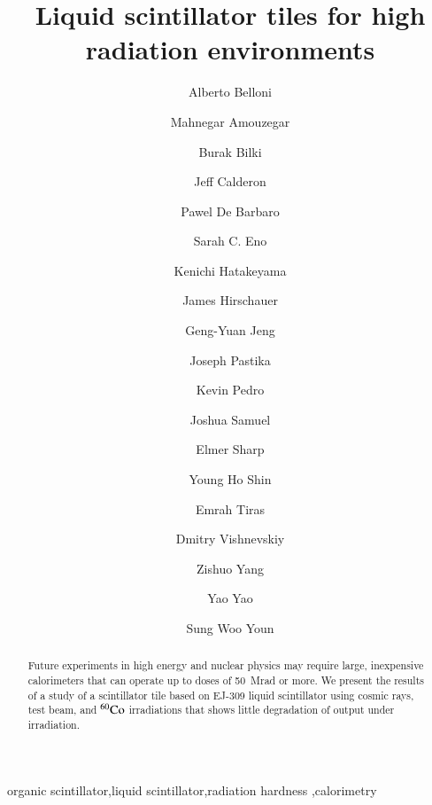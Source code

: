 \documentclass[review]{elsarticle}
\begin{document}
\begin{frontmatter}

\title{Liquid scintillator tiles for high radiation environments }


\author[umd]{Alberto Belloni}
\author[umd]{Mahnegar Amouzegar}
\author[iowa]{Burak Bilki}
\author[umd]{Jeff Calderon}
\author[rochester]{Pawel De Barbaro}
\author[umd]{Sarah C. Eno}
\author[baylor]{Kenichi Hatakeyama}
\author[fnal]{James Hirschauer}
\author[umd]{Geng-Yuan Jeng}
\author[baylor]{Joseph Pastika}
\author[fnal]{Kevin Pedro}
\author[umd]{Joshua Samuel}
\author[elmer]{Elmer Sharp}
\author[umd]{Young Ho Shin}
\author[baylor]{Emrah Tiras}
\author[rochester]{Dmitry Vishnevskiy}
\author[umd]{Zishuo Yang}
\author[umd]{Yao Yao}
\author[korea]{Sung Woo Youn}




\address[umd]{Dept. Physics, U. Maryland, College Park MD 30742 USA}
\address[eljen]{Eljen Technology, 1300 W. Broadway, Sweetwater, Tx 79556 USA}
\address[korea]{Institute for Basic Science, Center for Axion and Precision Physics Research, IBS Center for Axion and Precision Physics Research
Room 4315, Department of Physics, Natural Science Building (E6-2), KAIST,
291 Daehak-ro, Yuseong-gu, Daejeon 305-701, South Korea}
\address[elmer]{Elmer Sharp Engineering, 7007 Leesville Blvd. Springfield, VA 22151}
\address[fnal]{Fermi National Accelerator Laboratory, Batavia, IL, USA}
\address[baylor]{Baylor University, Waco, Texas, USA}
\address[iowa]{The University of Iowa, Iowa City, IA, USA}
\address[rochester]{The University of Rochester, Rochester, NY, USA}

\begin{abstract}
Future experiments in high energy and nuclear physics may require
large, inexpensive calorimeters that can operate up to doses of 50~Mrad
or more. We present the results of a study of a scintillator tile
based on EJ-309 liquid scintillator using cosmic rays, test beam, and
$\rm{^{60}Co}$ irradiations that shows little degradation of output
under irradiation.
\end{abstract}

\begin{keyword}
organic scintillator\sep liquid scintillator\sep radiation
hardness \sep calorimetry
\end{keyword}

\end{frontmatter}
\end{document}
